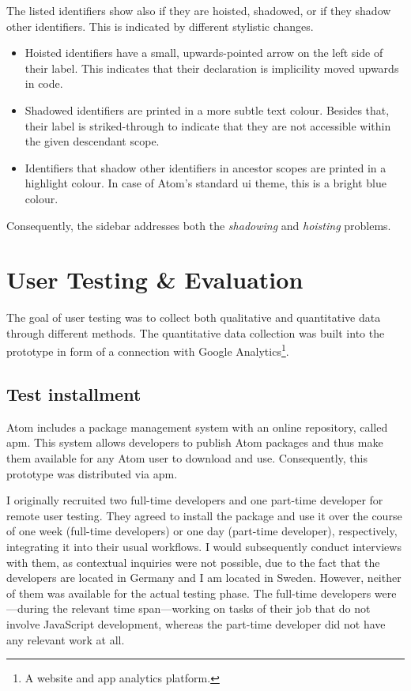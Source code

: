The listed identifiers show also if they are hoisted, shadowed, or if
they shadow other identifiers. This is indicated by different stylistic
changes.

\begin{itemize}
\itemsep1pt\parskip0pt
\item
  Hoisted identifiers have a small, upwards-pointed arrow on the left
  side of their label. This indicates that their declaration is
  implicility moved upwards in code.
\item
  Shadowed identifiers are printed in a more subtle text colour. Besides
  that, their label is striked-through to indicate that they are not
  accessible within the given descendant scope.
\item
  Identifiers that shadow other identifiers in ancestor scopes are
  printed in a highlight colour. In case of Atom’s standard \ac{ui}
  theme, this is a bright blue colour.
\end{itemize}

Consequently, the sidebar addresses both the \emph{shadowing} and
\emph{hoisting} problems.

\section{User Testing \& Evaluation}\label{user-testing-evaluation}

The goal of user testing was to collect both qualitative and
quantitative data through different methods. The quantitative data
collection was built into the prototype in form of a connection with
Google Analytics\footnote{A website and app analytics platform.}.

\subsection{Test installment}\label{test-installment}

Atom includes a package management system with an online repository,
called \ac{apm}. This system allows developers to publish Atom packages
and thus make them available for any Atom user to download and use.
Consequently, this prototype was distributed via \ac{apm}.

I originally recruited two full-time developers and one part-time
developer for remote user testing. They agreed to install the package
and use it over the course of one week (full-time developers) or one day
(part-time developer), respectively, integrating it into their usual
workflows. I would subsequently conduct interviews with them, as
contextual inquiries were not possible, due to the fact that the
developers are located in Germany and I am located in Sweden. However,
neither of them was available for the actual testing phase. The
full-time developers were—during the relevant time span—working on tasks
of their job that do not involve JavaScript development, whereas the
part-time developer did not have any relevant work at all.

